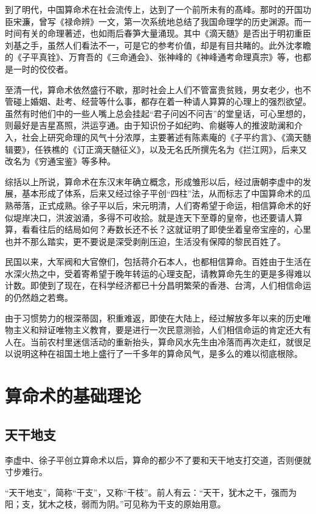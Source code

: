 \documentclass[a5paper,oneside,12pt]{ctexbook}
\begin{document}
到了明代，中国算命术在社会流传上，达到了一个前所未有的髙峰。那时的开国功臣宋濂，曾写《禄命辨》一文，第一次系统地总结了我国命理学的历史渊源。而一时间有关的命理著述，也如雨后春笋大量涌现。其中《滴天髄》是否出于明初重臣刘基之手，虽然人们看法不一，可是它的参考价值，却是有目共睹的。此外沈孝瞻的《子平真铨》、万育吾的《三命通会》、张神峰的《神峰通考命理真宗》等，也都是一时的佼佼者。

至清一代，算命术依然盛行不歇，那时社会上人们不管富贵贫贱，男女老少，也不管碰上婚姻、赴考、经营等什么事，都存在着一种请人算算的心理上的强烈欲望。虽然有时他们中的一些人嘴上总会挂起“君子问凶不问吉”的堂皇话，可心里想的，则最好是吉星髙照，洪运亨通。由于知识份子如纪昀、俞樾等人的推波助澜和介入，社会上研究命理的风气十分浓厚，主要著述有陈素庵的《子平约言》、《滴天髄辑要》，任铁樵的《订正滴天髄征义》，以及无名氏所撰先名为《拦江网》，后来又改名为《穷通宝鉴》等多种。

综括以上所说，算命术在东汉末年确立概念，形成雏形以后，经过唐朝李虚中的发展，基本形成了体系，后来又经过徐子平创“四柱”法，从而标志了中国算命术的瓜熟蒂落，正式成熟。徐子平以后，宋元明清，人们寄希望于命运，相信算命术的好似堤岸决口，洪波汹涌，多得不可收拾。就是连天下至尊的皇帝，也还要请人算算，看看往后的结局如何？寿数长还不长？这就证明了即使坐着皇帝宝座的，心里也并不那么踏实，更不要说是深受剥削压迫，生活没有保障的黎民百姓了。

民国以来，大军阀和大官僚们，包括蒋介石本人，也都相信算命。百姓由于生活在水深火热之中，受着寄希望于晚年转运的心理支配，请教算命先生的更是多得难以计数。即使到了现在，在科学经济都已十分昌明繁荣的香港、台湾，人们相信命运的仍然趋之若鸯。

由于习惯势力的根深蒂固，积重难返，即使在大陆上，经过解放多年以来的历史唯物主义和辩证唯物主义教育，要是进行一次民意测验，人们相信命运的肯定还大有人在。当前农村里迷信活动的重新抬头，算命风水先生由冷落而再次走红，就很足以说明这种在祖国土地上盛行了一千多年的算命风气，是多么的难以彻底根除。



\chapter{算命术的基础理论}
\section{天干地支}
李虚中、徐子平创立算命术以后，算命的都少不了要和天干地支打交道，否则便就寸步难行。

“天干地支”，简称“干支”，又称“干枝”。前人有云：“天干，犹木之干，强而为阳；支，犹木之枝，弱而为阴。”可见称为干支的原始用意。
\end{document}
